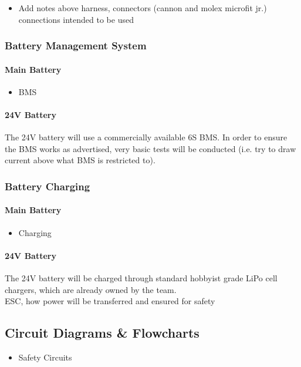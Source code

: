 \documentclass[main.tex]{subfiles}
\begin{document}
    \begin{itemize}
        \item Add notes above harness, connectors (cannon and molex microfit jr.) connections intended to be used
    \end{itemize}

    \subsubsection{Battery Management System}
    \paragraph{Main Battery}
    \begin{itemize}
        \item BMS
    \end{itemize}

    \paragraph{24V Battery}
    The 24V battery will use a commercially available 6S BMS. In order to ensure the BMS works as advertised, very basic tests will be conducted (i.e. try to draw current above what BMS is restricted to).
    \subsubsection{Battery Charging}
    \paragraph{Main Battery}
    \begin{itemize}
        \item Charging
    \end{itemize}
    \paragraph{24V Battery}
    The 24V battery will be charged through standard hobbyist grade LiPo cell chargers, which are already owned by the team.\\

    ESC, how power will be transferred and ensured for safety

    \subsection{Circuit Diagrams \& Flowcharts}
    \begin{itemize}
        \item Safety Circuits
    \end{itemize}
\end{document}
